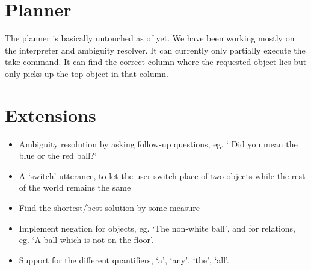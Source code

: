\documentclass[a4paper]{article}
\begin{document}
\section*{Planner}
The planner is basically untouched as of yet. We have been working mostly on
the interpreter and ambiguity resolver. It can currently only partially execute
the take command. It can find the correct column where the requested object
lies but only picks up the top object in that column.


\section*{Extensions}
\begin{itemize}
\item Ambiguity resolution by asking follow-up questions, eg. ` Did you mean the blue or the red ball?`
\item A `switch' utterance, to let the user switch place of two objects while the rest of the world remains the same
\item Find the shortest/best solution by some measure
\item Implement negation for objects, eg. `The non-white ball', and for relations, eg. `A ball which is not on the floor'.
\item Support for the different quantifiers, `a', `any', `the', `all'.
\end{itemize}
\end{document}
